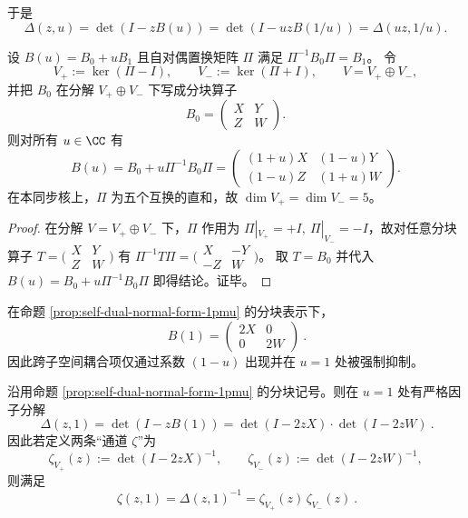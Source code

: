 于是
\[
\Delta(z,u)=\det(I-zB(u))=\det(I-uzB(1/u))=\Delta(uz,1/u).
\]

\begin{proposition}\label{prop:self-dual-normal-form-1pmu}
设 \(B(u)=B_0+uB_1\) 且自对偶置换矩阵 \(\Pi\) 满足 \(\Pi^{-1}B_0\Pi=B_1\)。
令
\[
V_+:=\ker(\Pi-I),\qquad V_-:=\ker(\Pi+I),
\qquad V=V_+\oplus V_-,
\]
并把 \(B_0\) 在分解 \(V_+\oplus V_-\) 下写成分块算子
\[
B_0=
\begin{pmatrix}
X & Y\\
Z & W
\end{pmatrix}.
\]
则对所有 \(u\in\CC\) 有
\[
\boxed{
B(u)=B_0+u\Pi^{-1}B_0\Pi
=
\begin{pmatrix}
(1+u)X & (1-u)Y\\
(1-u)Z & (1+u)W
\end{pmatrix}.
}
\]
在本同步核上，\(\Pi\) 为五个互换的直和，故 \(\dim V_+=\dim V_-=5\)。
\end{proposition}
\begin{proof}
在分解 \(V=V_+\oplus V_-\) 下，\(\Pi\) 作用为 \(\Pi|_{V_+}=+I,\ \Pi|_{V_-}=-I\)，故对任意分块算子 \(T=\bigl(\begin{smallmatrix}X&Y\\ Z&W\end{smallmatrix}\bigr)\) 有
\(
\Pi^{-1}T\Pi=\bigl(\begin{smallmatrix}X&-Y\\ -Z&W\end{smallmatrix}\bigr)
\)。
取 \(T=B_0\) 并代入 \(B(u)=B_0+u\Pi^{-1}B_0\Pi\) 即得结论。证毕。
\end{proof}

\begin{corollary}[\texorpdfstring{$u=1$}{u=1} 的强制解耦]\label{cor:self-dual-u1-decouple}
在命题 \ref{prop:self-dual-normal-form-1pmu} 的分块表示下，
\[
\boxed{\ B(1)=
\begin{pmatrix}
2X & 0\\
0 & 2W
\end{pmatrix}\ }.
\]
因此跨子空间耦合项仅通过系数 \((1-u)\) 出现并在 \(u=1\) 处被强制抑制。
\end{corollary}

\begin{corollary}[\texorpdfstring{$u=1$}{u=1} 的两通道 \texorpdfstring{$\Delta/\zeta$}{Delta/zeta} 分解]\label{cor:self-dual-u1-two-channel-zeta}
沿用命题 \ref{prop:self-dual-normal-form-1pmu} 的分块记号。则在 \(u=1\) 处有严格因子分解
\[
\boxed{\ \Delta(z,1)=\det(I-zB(1))=\det(I-2zX)\cdot\det(I-2zW)\ }.
\]
因此若定义两条“通道 \(\zeta\)”为
\[
\zeta_{V_+}(z):=\det(I-2zX)^{-1},\qquad
\zeta_{V_-}(z):=\det(I-2zW)^{-1},
\]
则满足
\[
\boxed{\ \zeta(z,1)=\Delta(z,1)^{-1}=\zeta_{V_+}(z)\,\zeta_{V_-}(z)\ }.
\]
\end{corollary}

